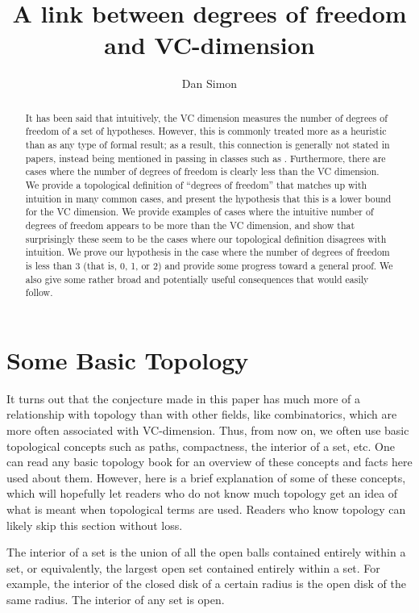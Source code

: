 \documentclass[12pt]{amsart}
\title[Final Presentation]
{A link between degrees of freedom and VC-dimension}
\author{Dan Simon}
\newcommand{\0}{\mat{0}}
\newcommand{\1}{\mathds{1}}
\begin{document}
\begin{abstract}
It has been said that intuitively, the VC dimension measures the number of degrees of freedom of a set of hypotheses. However, this is commonly treated more as a heuristic than as any type of formal result; as a result, this connection is generally not stated in papers, instead being mentioned in passing in classes such as \citep{thisclass}. Furthermore, there are cases where the number of degrees of freedom is clearly less than the VC dimension. We provide a topological definition of ``degrees of freedom'' that matches up with intuition in many common cases, and present the hypothesis that this is a lower bound for the VC dimension. We provide examples of cases where the intuitive number of degrees of freedom appears to be more than the VC dimension, and show that surprisingly these seem to be the cases where our topological definition disagrees with intuition. We prove our hypothesis in the case where the number of degrees of freedom is less than 3 (that is, 0, 1, or 2) and provide some progress toward a general proof. We also give some rather broad and potentially useful consequences that would easily follow.
\end{abstract}

\maketitle

\section{Some Basic Topology}
It turns out that the conjecture made in this paper has much more of a relationship with topology than with other fields, like combinatorics, which are more often associated with VC-dimension. Thus, from now on, we often use basic topological concepts such as paths, compactness, the interior of a set, etc. One can read any basic topology book for an overview of these concepts and facts here used about them. However, here is a brief explanation of some of these concepts, which will hopefully let readers who do not know much topology get an idea of what is meant when topological terms are used. Readers who know topology can likely skip this section without loss.

The interior of a set is the union of all the open balls contained entirely within a set, or equivalently, the largest open set contained entirely within a set. For example, the interior of the closed disk of a certain radius is the open disk of the same radius. The interior of any set is open.
\end{document}
